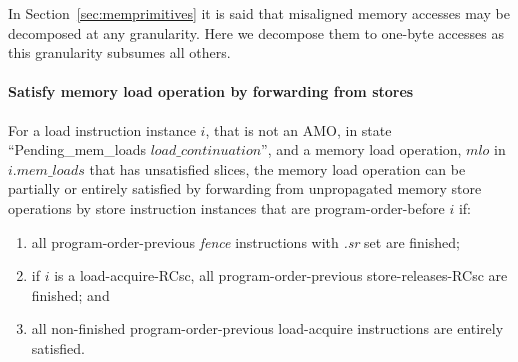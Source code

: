 \begin{commentary}
In Section~\ref{sec:memprimitives} it is said that misaligned memory accesses may be decomposed at any granularity.
Here we decompose them to one-byte accesses as this granularity subsumes all others.
\end{commentary}

\paragraph{Satisfy memory load operation by forwarding from stores}\label{omm:sat_by_forwarding}
For a load instruction instance $i$, that is not an AMO, in state ``{\sc Pending\_mem\_loads} $load\_continuation$'', and a memory load operation, $mlo$ in $i.mem\_loads$ that has unsatisfied slices, the memory load operation can be partially or entirely satisfied by forwarding from unpropagated memory store operations by store instruction instances that are program-order-before $i$ if:
\begin{enumerate}
\item all program-order-previous {\em fence} instructions with {\em .sr} set are finished;
\item if $i$ is a load-acquire-RCsc, all program-order-previous store-releases-RCsc are finished; and
\item all non-finished program-order-previous load-acquire instructions are entirely satisfied.
\end{enumerate}

